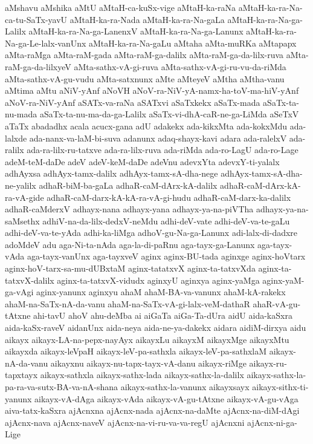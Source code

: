 {aMshavu
aMshika
aMtU
aMtaH-ca-kuSx-vige
aMtaH-ka-raNa
aMtaH-ka-ra-Na-ca-tu-SaTx-yavU
aMtaH-ka-ra-Nada
aMtaH-ka-ra-Na-gaLa
aMtaH-ka-ra-Na-ga-Lalilx
aMtaH-ka-ra-Na-ga-LanenxV
aMtaH-ka-ra-Na-ga-Lanunx
aMtaH-ka-ra-Na-ga-Le-lalx-vanUnx
aMtaH-ka-ra-Na-gaLu
aMtaha
aMta-muRKa
aMtapapx
aMta-raMga
aMta-raM-gada
aMta-raM-ga-dalilx
aMta-raM-ga-da-lilx-ruva
aMta-raM-ga-da-lilxyeV
aMta-sathx-vA-gi-ruva
aMta-sathx-vA-gi-ru-vu-da-riMda
aMta-sathx-vA-gu-vudu
aMta-satxnunx
aMte
aMteyeV
aMtha
aMtha-vanu
aMtima
aMtu
aNiV-yAnf
aNoVH
aNoV-ra-NiV-yA-namx-ha-toV-ma-hiV-yAnf
aNoV-ra-NiV-yAnf
aSATx-va-raNa
aSATxvi
aSaTxkekx
aSaTx-mada
aSaTx-ta-nu-mada
aSaTx-ta-nu-ma-da-ga-Lalilx
aSaTx-vi-dhA-caR-ne-ga-LiMda
aSeTxV
aTaTx
abadadhx
acala
acucx-gana
adU
adakekx
ada-kikxMta
ada-kokxMdu
ada-lalxde
ada-nanx-va-laM-bi-suva
adanunx
adaq-shayx-kavi
adara
ada-ralelxV
ada-ralilx
ada-ra-lilx-ru-tatxve
ada-ra-lilx-ruva
ada-riMda
ada-ro-LagU
ada-ro-Lage
adeM-teM-daDe
adeV
adeV-keM-daDe
adeVnu
adevxYta
adevxY-ti-yalalx
adhAyxsa
adhAyx-tamx-dalilx
adhAyx-tamx-sA-dha-nege
adhAyx-tamx-sA-dha-ne-yalilx
adhaR-biM-ba-gaLa
adhaR-caM-dArx-kA-dalilx
adhaR-caM-dArx-kA-ra-vA-gide
adhaR-caM-darx-kA-kA-ra-vA-gi-hudu
adhaR-caM-darx-ka-dalilx
adhaR-caMderxV
adhayx-nana
adhayx-yana
adhayx-ya-na-piVTha
adhayx-ya-na-saMsethx
adhiV-na-da-lilx-dedxV-neMdu
adhi-deV-vate
adhi-deV-va-te-gaLu
adhi-deV-va-te-yAda
adhi-ka-liMga
adhoV-gu-Na-ga-Lanunx
adi-lalx-di-dadxre
adoMdeV
adu
aga-Ni-ta-nAda
aga-la-di-paRnu
aga-tayx-ga-Lanunx
aga-tayx-vAda
aga-tayx-vanUnx
aga-tayxveV
aginx
aginx-BU-tada
aginxge
aginx-hoVtarx
aginx-hoV-tarx-sa-mu-dUBxtaM
aginx-tatatxvX
aginx-ta-tatxvXda
aginx-ta-tatxvX-dalilx
aginx-ta-tatxvX-vidudx
aginxyU
aginxya
aginx-yaMga
aginx-yaM-ga-vAgi
aginx-yanunx
aginxyu
ahaM
ahaM-BA-va-vanunx
ahaM-kA-rakekx
ahaM-na-SaTx-nA-da-vanu
ahaM-na-SaTx-vA-gi-lalx-veM-dathaR
ahaR-vA-gu-tAtxne
ahi-tavU
ahoV
ahu-deMba
ai
aiGaTa
aiGa-Ta-dUra
aidU
aida-kaSxra
aida-kaSx-raveV
aidanUnx
aida-neya
aida-ne-ya-dakekx
aidara
aidiM-dirxya
aidu
aikayx
aikayx-LA-na-pepx-nayAyx
aikayxLu
aikayxM
aikayxMge
aikayxMtu
aikayxda
aikayx-leVpaH
aikayx-leV-pa-sathxla
aikayx-leV-pa-sathxlaM
aikayx-nA-da-vanu
aikayxnu
aikayx-nu-tapx-tayx-vA-danu
aikayx-riMge
aikayx-ru-tapxtayx
aikayx-sathxla
aikayx-sathx-lada
aikayx-sathx-la-dalilx
aikayx-sathx-la-pa-ra-va-sutx-BA-va-nA-shana
aikayx-sathx-la-vanunx
aikayxsayx
aikayx-sithx-ti-yanunx
aikayx-vA-dAga
aikayx-vAda
aikayx-vA-gu-tAtxne
aikayx-vA-gu-vAga
aiva-tatx-kaSxra
ajAcnxna
ajAcnx-nada
ajAcnx-na-daMte
ajAcnx-na-diM-dAgi
ajAcnx-nava
ajAcnx-naveV
ajAcnx-na-vi-ru-va-va-regU
ajAcnxni
ajAcnx-ni-ga-Lige
}
